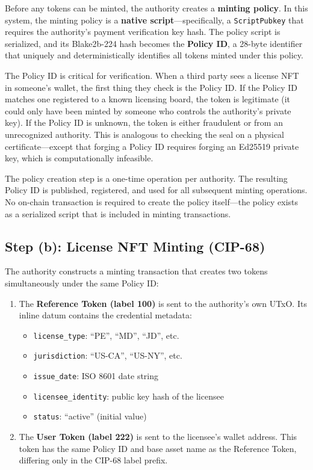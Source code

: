 Before any tokens can be minted, the authority creates a \textbf{minting policy}. In this system, the minting policy is a \textbf{native script}---specifically, a \texttt{ScriptPubkey} that requires the authority's payment verification key hash. The policy script is serialized, and its Blake2b-224 hash becomes the \textbf{Policy ID}, a 28-byte identifier that uniquely and deterministically identifies all tokens minted under this policy.

The Policy ID is critical for verification. When a third party sees a license NFT in someone's wallet, the first thing they check is the Policy ID. If the Policy ID matches one registered to a known licensing board, the token is legitimate (it could only have been minted by someone who controls the authority's private key). If the Policy ID is unknown, the token is either fraudulent or from an unrecognized authority. This is analogous to checking the seal on a physical certificate---except that forging a Policy ID requires forging an Ed25519 private key, which is computationally infeasible.

The policy creation step is a one-time operation per authority. The resulting Policy ID is published, registered, and used for all subsequent minting operations. No on-chain transaction is required to create the policy itself---the policy exists as a serialized script that is included in minting transactions.

\subsection{Step (b): License NFT Minting (CIP-68)}

The authority constructs a minting transaction that creates two tokens simultaneously under the same Policy ID:

\begin{enumerate}[nosep]
  \item The \textbf{Reference Token (label 100)} is sent to the authority's own UTxO. Its inline datum contains the credential metadata:
  \begin{itemize}[nosep]
    \item \texttt{license\_type}: ``PE'', ``MD'', ``JD'', etc.
    \item \texttt{jurisdiction}: ``US-CA'', ``US-NY'', etc.
    \item \texttt{issue\_date}: ISO 8601 date string
    \item \texttt{licensee\_identity}: public key hash of the licensee
    \item \texttt{status}: ``active'' (initial value)
  \end{itemize}
  \item The \textbf{User Token (label 222)} is sent to the licensee's wallet address. This token has the same Policy ID and base asset name as the Reference Token, differing only in the CIP-68 label prefix.
\end{enumerate}

